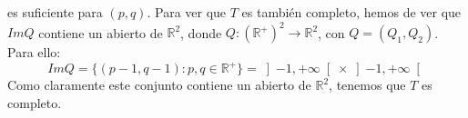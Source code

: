 \begin{ejercicio}
\begin{enumerate}[label=\alph*)]
\begin{equation*}
            \end{equation*}
            es suficiente para $(p,q)$. Para ver que $T$ es también completo, hemos de ver que $Im Q$ contiene un abierto de $\mathbb{R}^2$, donde $Q:{(\mathbb{R}^+)}^{2}\to \mathbb{R}^2$, con $Q=(Q_1,Q_2)$. Para ello:
            \begin{equation*}
                Im Q = \{(p-1,q-1):p,q\in \mathbb{R}^+\} = \left]-1,+\infty\right[\times \left]-1,+\infty\right[
            \end{equation*}
            Como claramente este conjunto contiene un abierto de $\mathbb{R}^2$, tenemos que $T$ es completo.
    \end{enumerate}
\end{ejercicio}
